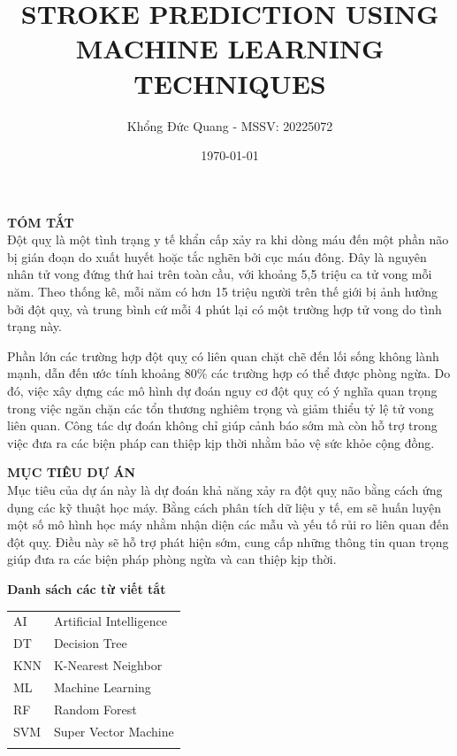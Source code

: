 \documentclass[11pt]{article}
\title{STROKE PREDICTION USING MACHINE LEARNING TECHNIQUES}
\author{Khổng Đức Quang - MSSV: 20225072}
\date{\today}
\begin{document}
	\maketitle
	\textbf{TÓM TẮT}\\
	
	Đột quỵ là một tình trạng y tế khẩn cấp xảy ra khi dòng máu đến một phần não bị gián đoạn do xuất huyết hoặc tắc nghẽn bởi cục máu đông. Đây là nguyên nhân tử vong đứng thứ hai trên toàn cầu, với khoảng 5,5 triệu ca tử vong mỗi năm. Theo thống kê, mỗi năm có hơn 15 triệu người trên thế giới bị ảnh hưởng bởi đột quỵ, và trung bình cứ mỗi 4 phút lại có một trường hợp tử vong do tình trạng này.

	Phần lớn các trường hợp đột quỵ có liên quan chặt chẽ đến lối sống không lành mạnh, dẫn đến ước tính khoảng 80\% các trường hợp có thể được phòng ngừa. Do đó, việc xây dựng các mô hình dự đoán nguy cơ đột quỵ có ý nghĩa quan trọng trong việc ngăn chặn các tổn thương nghiêm trọng và giảm thiểu tỷ lệ tử vong liên quan. Công tác dự đoán không chỉ giúp cảnh báo sớm mà còn hỗ trợ trong việc đưa ra các biện pháp can thiệp kịp thời nhằm bảo vệ sức khỏe cộng đồng.
	
	\vspace{0.3cm}
	
	\textbf{MỤC TIÊU DỰ ÁN}\\
	 
	Mục tiêu của dự án này là dự đoán khả năng xảy ra đột quỵ não bằng cách ứng dụng các kỹ thuật học máy. Bằng cách phân tích dữ liệu y tế, em sẽ huấn luyện một số mô hình học máy nhằm nhận diện các mẫu và yếu tố rủi ro liên quan đến đột quỵ. Điều này sẽ hỗ trợ phát hiện sớm, cung cấp những thông tin quan trọng giúp đưa ra các biện pháp phòng ngừa và can thiệp kịp thời.
	\pagebreak
	
	\textbf{Danh sách các từ viết tắt}\\
	
	\begin{tabular}{l l}
		
		\vspace{0.25cm}
		AI  & Artificial Intelligence \\
		\vspace{0.25cm}
		DT  & Decision Tree \\
		\vspace{0.25cm}
		KNN & K-Nearest Neighbor \\
		\vspace{0.25cm}
		ML  & Machine Learning \\
		\vspace{0.25cm}
		RF  & Random Forest \\
		\vspace{0.25cm}
		SVM & Super Vector Machine \\
		\vspace{0.25cm}
	\end{tabular}
	
\end{document}
